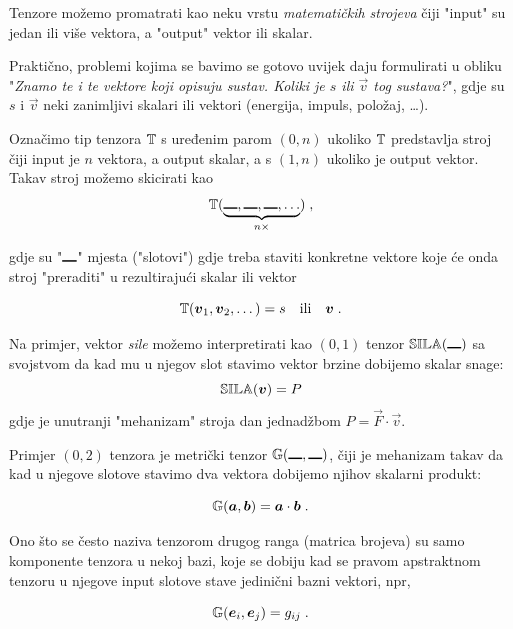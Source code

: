 Tenzore možemo promatrati kao neku vrstu \emph{matematičkih strojeva}
\cite{MTW:2017}
čiji "input" su jedan ili više vektora, a "output" vektor ili
skalar. 

Praktično, problemi kojima se bavimo se gotovo uvijek daju formulirati
u obliku "\emph{Znamo te i te vektore koji opisuju sustav. Koliki
je $s$ ili $\vec{v}$ tog sustava?}", gdje su $s$ i $\vec{v}$ neki
zanimljivi skalari ili vektori (energija, impuls, položaj, \dots).

Označimo tip tenzora $\mathbb{T}$ s uređenim parom $(0, n)$ ukoliko 
$\mathbb{T}$ predstavlja stroj čiji input je $n$ vektora, a output skalar,
a s $(1, n)$ ukoliko je output vektor. Takav stroj
možemo skicirati kao
\begin{equation}
   \bbtensor{T}(\underbrace{\slot, \slot, \slot, \dots}_{n \times})  \;,
\end{equation}

gdje su "$\rule{1em}{1pt}$" mjesta ("slotovi") gdje treba staviti konkretne vektore
koje će onda stroj "preraditi" u rezultirajući skalar ili vektor

\begin{equation}
   \bbtensor{T}(\vec{v}_1, \vec{v}_2, \dots) = s \quad \text{ili} \quad \vec{v} \;.
\end{equation}

Na primjer, vektor \emph{sile} možemo interpretirati kao
$(0, 1)$ tenzor $\bbtensor{SILA}(\slot)$ sa svojstvom da kad mu
u njegov slot stavimo vektor brzine dobijemo skalar snage:
\begin{equation}
   \bbtensor{SILA}(\vec{v}) = P
\end{equation}
gdje je unutranji "mehanizam" stroja dan jednadžbom $P = \vec{F}\cdot\vec{v}$.

Primjer $(0,2)$ tenzora je metrički tenzor $\bbtensor{G}(\slot, \slot)$,
čiji je mehanizam takav da kad u njegove slotove stavimo dva vektora
dobijemo njihov skalarni produkt:

\begin{equation}
   \bbtensor{G}(\vec{a}, \vec{b}) = \vec{a}\cdot\vec{b} \;.
\end{equation}

Ono što se često naziva tenzorom drugog ranga (matrica brojeva) su
samo komponente tenzora u nekoj bazi, koje se
dobiju kad se pravom apstraktnom tenzoru u njegove input slotove
stave jedinični bazni vektori, npr,

\begin{equation}
   \bbtensor{G}(\vec{e}_i, \vec{e}_j) = g_{ij} \;.
\label{eq:Gkomponente}
\end{equation}

